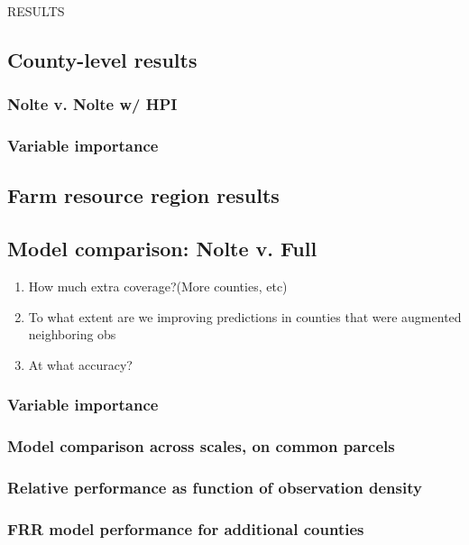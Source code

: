 \documentclass[12pt]{article}
\begin{document}

RESULTS
\subsection{County-level results}
 \subsubsection{Nolte v. Nolte w/ HPI}
 
 \subsubsection{Variable importance}

\subsection{Farm resource region results}

 \subsection{Model comparison: Nolte v. Full}
  \begin{enumerate}
    \item How much extra coverage?(More counties, etc)
    \item To what extent are we improving predictions in counties that were augmented neighboring obs
    \item At what accuracy?
 \end{enumerate}
 
 
 \subsubsection{Variable importance}
 \subsubsection{Model comparison across scales, on common parcels}
 \subsubsection{Relative performance as function of observation density}
 \subsubsection{FRR model performance for additional counties}
 
\end{document}
